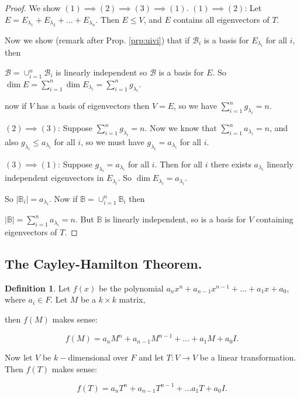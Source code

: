 \documentclass{article}
\theoremstyle{definition} \newtheorem*{definition}{Definition}
\newcommand{\B}{\mathcal{B}}
\begin{document}
\begin{proof}
  We show $(1) \implies (2) \implies (3) \implies (1)$.
  $(1) \implies (2)$: Let $E = E_{\lambda_1} + E_{\lambda_2} + \dots
  + E_{\lambda_n}$.
  Then $E \leq V$, and $E$ contains all eigenvectors of $T$.

  Now we show (remark after Prop. \ref{prp:uivi}) that if $\B_i$ is
  a basis for $E_{\lambda_i}$ for all $i$, then

  $\B = \cup_{i=1}^n \B_i$ is linearly independent so $\B$ is a basis
  for $E$. So $\dim E = \sum_{i=1}^n \dim E_{\lambda_i} = \sum_{i=1}^n g_{\lambda_i}$.

  now if $V$ has a basis of eigenvectors then $V = E$,
  so we have $\sum_{i=1}^n g_{\lambda_i} = n$.

  $(2) \implies (3)$: Suppose $\sum_{i=1}^n g_{\lambda_i} = n$. Now we know
  that $\sum_{i=1}^n a_{\lambda_i} = n$, and also $g_{\lambda_i}\leq
  a_{\lambda_i}$ for all $i$, so we must have $g_{\lambda_i} =
  a_{\lambda_i}$ for all $i$.

  $(3) \implies (1)$: Suppose $g_{\lambda_i} = a_{\lambda_i}$ for all $i$.
  Then for all $i$ there exists $a_{\lambda_i}$ linearly independent
  eigenvectors in $E_{\lambda_i}$. So $\dim E_{\lambda_i} = a_{\lambda_i}$.

  So $|\mathbb{B}_i| = a_{\lambda_i}$. Now if $\mathbb{B} =
  \cup_{i=1}^n \mathbb{B}_i$ then 

  $|\mathbb{B}| = \sum_{i=1}^n a_{\lambda_i} = n$. But $\mathbb{B}$ is 
  linearly independent, so is a basis for $V$ containing eigenvectors of
  $T$.
\end{proof}

\subsection{The Cayley-Hamilton Theorem.}

\begin{definition}
  Let $f(x)$ be the polynomial $a_nx^n + a_{n-1}x^{n-1} + \dots + 
  a_1 x + a_0$, where $a_i \in F$. Let $M$ be a $k \times k$ matrix,

  then $f(M)$  makes sense:

  \[
    f(M) = a_n M^n + a_{n-1} M^{n-1} + \dots + a_1 M + a_0 I.
  \]

  Now let $V$ be  $k-$dimensional  over $F$ and let $T : V \rightarrow V$
  be a linear transformation. Then $f(T)$ makes sense:

  \[
    f(T) = a_n T^n + a_{n-1} T^{n-1} + \dots a_1 T + a_0 I.
  \]
\end{definition}
\end{document}
